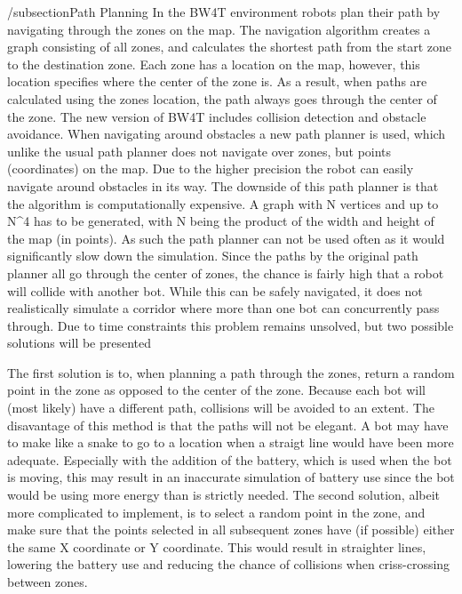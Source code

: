 /subsection{Path Planning}
In the BW4T environment robots plan their path by navigating through the zones on the map. The navigation algorithm creates a graph consisting of all zones, and calculates the shortest path from the start zone to the destination zone. Each zone has a location on the map, however, this location specifies where the center of the zone is. As a result, when paths are calculated using the zones location, the path always goes through the center of the zone. 
The new version of BW4T includes collision detection and obstacle avoidance. When navigating around obstacles a new path planner is used, which unlike the usual path planner does not navigate over zones, but points (coordinates) on the map. Due to the higher precision the robot can easily navigate around obstacles in its way. The downside of this path planner is that the algorithm is computationally expensive. A graph with N vertices and up to N^4 has to be generated, with N being the product of the width and height of the map (in points). As such the path planner can not be used often as it would significantly slow down the simulation.
Since the paths by the original path planner all go through the center of zones, the chance is fairly high that a robot will collide with another bot. While this can be safely navigated, it does not realistically simulate a corridor where more than one bot can concurrently pass through. Due to time constraints this problem remains unsolved, but two possible solutions will be presented

The first solution is to, when planning a path through the zones, return a random point in the zone as opposed to the center of the zone. Because each bot will (most likely) have a different path, collisions will be avoided to an extent. The disavantage of this method is that the paths will not be elegant. A bot may have to make like a snake to go to a location when a straigt line would have been more adequate. Especially with the addition of the battery, which is used when the bot is moving, this may result in an inaccurate simulation of battery use since the bot would be using more energy than is strictly needed.
The second solution, albeit more complicated to implement, is to select a random point in the zone, and make sure that the points selected in all subsequent zones have (if possible) either the same X coordinate or Y coordinate. This would result in straighter lines, lowering the battery use and reducing the chance of collisions when criss-crossing between zones. 

